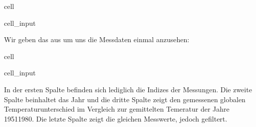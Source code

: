 \documentclass[letterpaper,10pt,english]{jupyterBook}
\begin{document}
\begin{sphinxuseclass}{cell}\begin{sphinxVerbatimInput}

\begin{sphinxuseclass}{cell_input}
\begin{sphinxVerbatim}[commandchars=\\\{\}]
  
      
\end{sphinxVerbatim}

\end{sphinxuseclass}\end{sphinxVerbatimInput}

\end{sphinxuseclass}
\sphinxAtStartPar
Wir geben das  aus um uns die Messdaten einmal anzusehen:

\begin{sphinxuseclass}{cell}\begin{sphinxVerbatimInput}

\begin{sphinxuseclass}{cell_input}
\begin{sphinxVerbatim}[commandchars=\\\{\}]
 
\end{sphinxVerbatim}

\end{sphinxuseclass}\end{sphinxVerbatimInput}

\end{sphinxuseclass}
\sphinxAtStartPar
In der ersten Spalte befinden sich lediglich die Indizes der Messungen. Die zweite Spalte beinhaltet das Jahr und die dritte Spalte zeigt den gemessenen globalen Temperaturunterschied im Vergleich zur gemittelten Temeratur der Jahre 1951\sphinxhyphen{}1980. Die letzte Spalte zeigt die gleichen Messwerte, jedoch gefiltert.
\end{document}
